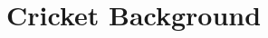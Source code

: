 \documentclass[12pt,a4paper]{report}
\theoremstyle{definition}
\begin{document}
%
%
%
%
%




\appendix


\chapter{Cricket Background} \label{chap:CrickBackground}
\end{document}
